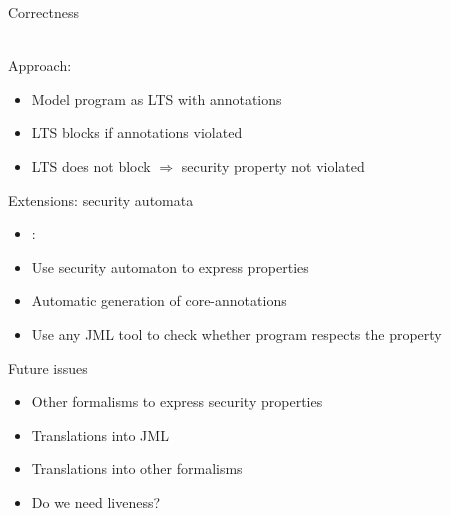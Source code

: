 \documentclass[final,nocolorBG,a4,marieke,nototal,pdf, accumulate,slideColor]{prosper}
\begin{document}
\begin{slide}{Correctness}

\begin{center}
\end{center}
\ \smallskip\\
Approach:
\begin{itemize}
\item Model program as LTS with annotations
\item LTS blocks if annotations violated
\item LTS does not block \(\Rightarrow\) security property not violated
\end{itemize}
\end{slide}

\begin{slide}{Extensions: security automata}
\begin{itemize}
\item {}: 
\item Use security automaton to express properties
\item Automatic generation of core-annotations
\item Use any JML tool to check whether program respects the property
\end{itemize}
\end{slide}

\begin{slide}{Future issues}
\begin{itemize}
\item Other formalisms to express security properties
\item Translations into JML
\item Translations into other formalisms
\item Do we need liveness?
\end{itemize}
\end{slide}
\end{document}
